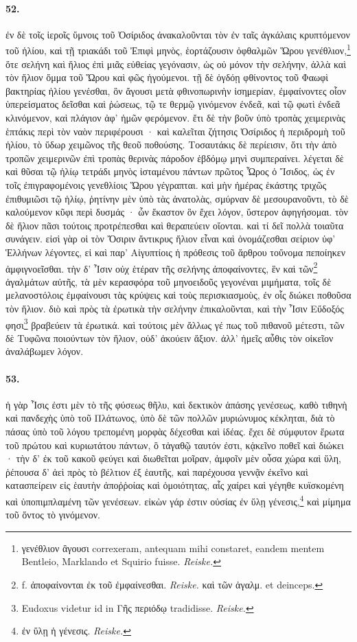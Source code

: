 \documentclass[a4paper, 11pt, oneside, polutonikogreek, german]{article}
\begin{document}
\paragraph{52.}
ἐν δὲ τοῖς ἱεροῖς ὕμνοις τοῦ Ὀσίριδος ἀνακαλοῦνται τὸν ἐν ταῖς ἀγκάλαις κρυπτόμενον τοῦ ἡλίου, καὶ τῇ τριακάδι τοῦ Ἐπιφὶ μηνὸς, ἑορτάζουσιν ὀφθαλμῶν Ὥρου γενέθλιον,\footnote{γενέθλιον ἂγουσι correxeram, antequam mihi constaret, eandem mentem Bentleio, Marklando et Squirio fuisse. \emph{Reiske.}} ὅτε σελήνη καὶ ἥλιος ἐπὶ μιᾶς εὐθείας γεγόνασιν, ὡς οὐ μόνον τὴν σελήνην, ἀλλὰ καὶ τὸν ἥλιον ὄμμα τοῦ Ὥρου καὶ φῶς ἡγούμενοι. τῇ δὲ ὀγδόῃ φθίνοντος τοῦ Φαωφὶ βακτηρίας ἡλίου γενέσθαι, ὃν ἄγουσι μετὰ φθινοπωρινὴν ἰσημερίαν, ἐμφαίνοντες οἷον ὑπερείσματος δεῖσθαι καὶ ῥώσεως, τῷ τε θερμῷ γινόμενον ἐνδεᾶ, καὶ τῷ φωτὶ ἐνδεᾶ κλινόμενον, καὶ πλάγιον ἀφ' ἡμῶν φερόμενον. ἔτι δὲ τὴν βοῦν ὑπὸ τροπὰς χειμερινὰς ἑπτάκις περὶ τὸν ναὸν περιφέρουσι · καὶ καλεῖται ζήτησις Ὀσίριδος ἡ περιδρομὴ τοῦ ἡλίου, τὸ ὕδωρ χειμῶνος τῆς θεοῦ ποθούσης. Τοσαυτάκις δὲ περίεισιν, ὅτι τὴν ἀπὸ τροπῶν χειμερινῶν ἐπὶ τροπὰς θερινὰς πάροδον ἑβδόμῳ μηνὶ συμπεραίνει. λέγεται δὲ καὶ θῦσαι τῷ ἡλίῳ τετράδι μηνὸς ἱσταμένου πάντων πρῶτος Ὧρος ὁ Ἴσιδος, ὡς ἐν τοῖς ἐπιγραφομένοις γενεθλίοις Ὥρου γέγραπται. καὶ μὴν ἡμέρας ἑκάστης τριχῶς ἐπιθυμιῶσι τῷ ἡλίῳ, ῥητίνην μὲν ὑπὸ τὰς ἀνατολὰς, σμύρναν δὲ μεσουρανοῦντι, τὸ δὲ καλούμενον κῦφι περὶ δυσμάς · ὧν ἕκαστον ὃν ἔχει λόγον, ὕστερον ἀφηγήσομαι. τὸν δὲ ἥλιον πᾶσι τούτοις προτρέπεσθαι καὶ θεραπεύειν οἴονται. καὶ τί δεῖ πολλὰ τοιαῦτα συνάγειν. εἰσὶ γὰρ οἱ τὸν Ὄσιριν ἄντικρυς ἥλιον εἶναι καὶ ὀνομάζεσθαι σείριον ὑφ' Ἑλλήνων λέγοντες, εἰ καὶ παρ' Αἰγυπτίοις ἡ πρόθεσις τοῦ ἄρθρου τοὔνομα πεποίηκεν ἀμφιγνοεῖσθαι. τὴν δ' Ἶσιν οὐχ ἑτέραν τῆς σελήνης ἀποφαίνοντες, ἓν καὶ τῶν\footnote{f. ἀποφαίνονται ἐκ τοῦ ἐμφαίνεσθαι. \emph{Reiske.} καὶ τῶν ἀγαλμ. et deinceps.} ἀγαλμάτων αὐτῆς, τὰ μὲν κερασφόρα τοῦ μηνοειδοῦς γεγονέναι μιμήματα, τοῖς δὲ μελανοστόλοις ἐμφαίνουσι τὰς κρύψεις καὶ τοὺς περισκιασμοὺς, ἐν οἷς διώκει ποθοῦσα τὸν ἥλιον. διὸ καὶ πρὸς τὰ ἐρωτικὰ τὴν σελήνην ἐπικαλοῦνται, καὶ τὴν Ἶσιν Εὔδοξός φησι\footnote{Eudoxus videtur id in Γῆς περιόδῳ tradidisse. \emph{Reiske.}} βραβεύειν τὰ ἐρωτικά. καὶ τούτοις μὲν ἄλλως γέ πως τοῦ πιθανοῦ μέτεστι, τῶν δὲ Τυφῶνα ποιούντων τὸν ἥλιον, οὐδ' ἀκούειν ἄξιον. ἀλλ' ἡμεῖς αὖθις τὸν οἰκεῖον ἀναλάβωμεν λόγον.

\paragraph{53.}
ἡ γὰρ Ἶσις ἐστι μὲν τὸ τῆς φύσεως θῆλυ, καὶ δεκτικὸν ἁπάσης γενέσεως, καθὸ τιθηνὴ καὶ πανδεχὴς ὑπὸ τοῦ Πλάτωνος, ὑπὸ δὲ τῶν πολλῶν μυριώνυμος κέκληται, διὰ τὸ πάσας ὑπὸ τοῦ λόγου τρεπομένη μορφὰς δέχεσθαι καὶ ἰδέας. ἔχει δὲ σύμφυτον ἔρωτα τοῦ πρώτου καὶ κυριωτάτου πάντων, ὃ τἀγαθῷ ταυτόν ἐστι, κᾀκεῖνο ποθεῖ καὶ διώκει · τὴν δ' ἐκ τοῦ κακοῦ φεύγει καὶ διωθεῖται μοῖραν, ἀμφοῖν μὲν οὖσα χώρα καὶ ὕλη, ῥέπουσα δ' ἀεὶ πρὸς τὸ βέλτιον ἐξ ἑαυτῆς, καὶ παρέχουσα γεννᾷν ἐκεῖνο καὶ κατασπείρειν εἰς ἑαυτὴν ἀποῤῥοίας καὶ ὁμοιότητας, αἷς χαίρει καὶ γέγηθε κυϊσκομένη καὶ ὑποπιμπλαμένη τῶν γενέσεων. εἰκὼν γάρ ἐστιν οὐσίας ἐν ὕλῃ γένεσις,\footnote{ἐν ὕλῃ ἡ γένεσις. \emph{Reiske.}} καὶ μίμημα τοῦ ὄντος τὸ γινόμενον.
\end{document}
